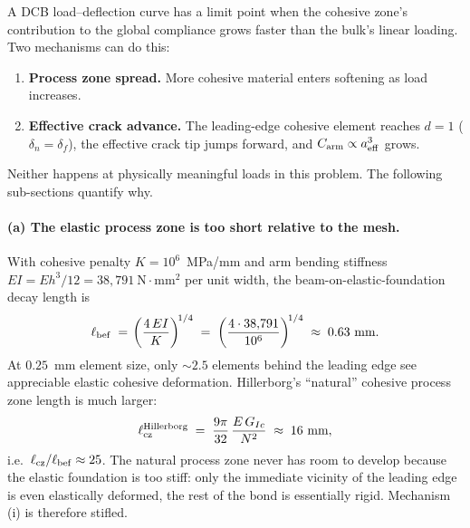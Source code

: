 A DCB load--deflection curve has a limit point when the cohesive zone's
contribution to the global compliance grows faster than the bulk's
linear loading. Two mechanisms can do this:
\begin{enumerate}
\item[(i)] \textbf{Process zone spread.} More cohesive material enters
  softening as load increases.
\item[(ii)] \textbf{Effective crack advance.} The leading-edge cohesive
  element reaches $d=1$ ($\delta_n = \delta_f$), the effective crack
  tip jumps forward, and $C_{\rm arm} \propto a_{\rm eff}^3$ grows.
\end{enumerate}
Neither happens at physically meaningful loads in this problem. The
following sub-sections quantify why.

\paragraph{(a) The elastic process zone is too short relative to the mesh.}
With cohesive penalty $K = 10^{6}$~MPa/mm and arm bending stiffness
$EI = E h^3/12 = 38{,}791~\text{N}\!\cdot\!\text{mm}^2$ per unit width, the
beam-on-elastic-foundation decay length is
\begin{equation}
\ell_{\rm bef} \;=\; \!\left(\frac{4\,EI}{K}\right)^{\!1/4}
\;=\; \left(\frac{4 \cdot 38{,}791}{10^{6}}\right)^{\!1/4}
\;\approx\; 0.63~\text{mm}.
\end{equation}
At $0.25$~mm element size, only $\sim 2.5$ elements behind the leading
edge see appreciable elastic cohesive deformation. Hillerborg's
``natural'' cohesive process zone length is much larger:
\begin{equation}
\ell_{\rm cz}^{\rm Hillerborg} \;=\; \frac{9\pi}{32}\,\frac{E\,G_{Ic}}{N^{2}}
\;\approx\; 16~\text{mm},
\end{equation}
i.e.\ $\ell_{\rm cz}/\ell_{\rm bef} \approx 25$. The natural process
zone never has room to develop because the elastic foundation is too
stiff: only the immediate vicinity of the leading edge is even
elastically deformed, the rest of the bond is essentially rigid.
Mechanism (i) is therefore stifled.

